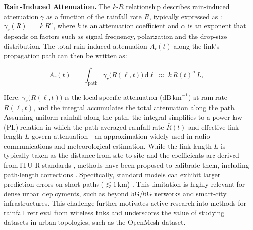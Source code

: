 \documentclass[manuscript]{copernicus}
\begin{document}
\textbf{Rain-Induced Attenuation.}
The \(k\text{-}R\) relationship describes rain-induced attenuation \(\gamma\) 
as a function of the rainfall rate \(R\), typically expressed as \citep{ITU,Olsen}:
\( \gamma_{r}(R) \;=\; k\,R^{\alpha}\), where \(k\) is an attenuation coefficient and \(\alpha\) is an exponent that depends on factors 
such as signal frequency, polarization and the drop-size distribution. 
The total rain-induced attenuation \(A_r(t)\) along the link’s propagation path can then be written as:

\begin{equation} \label{eq.PL}
    A_{r}(t) 
    \;=\; \int_{\text{path}} \gamma_{r}\bigl(R(\ell,t)\bigr)\,\mathrm{d}\ell  
    \; \approx \; k\,\overline{R}(t)^{\alpha}\, L,
\end{equation}

Here, \(\gamma_{r}\bigl(R(\ell,t)\bigr)\) is the local specific attenuation ($\mathrm{dB}\,\mathrm{km}^{-1}$) at rain rate \(R(\ell,t)\), and the integral accumulates the total attenuation along the path. 
Assuming uniform rainfall along the path, the integral simplifies to a power‑law (PL) relation in which the path‑averaged rainfall rate \(\overline{R}(t)\) and effective link length \(L\) govern attenuation—an approximation widely used in radio communications and meteorological estimation.
While the link length $L$ is typically taken as the distance from site to site and the coefficients are derived from ITU-R standards \citep{ITU837}, methods have been proposed to calibrate them, including path-length corrections \citep{ostrometzky2016calibration,da2007prediction,janco2022rain}. Specifically, standard models can exhibit larger prediction errors on short paths ($\lesssim 1\ \mathrm{km}$) \citep{habi2020uncertainties,janco2023city}. This limitation is highly relevant for dense urban deployments, such as beyond 5G/6G networks and smart-city infrastructures. This challenge further motivates active research into methods for rainfall retrieval from wireless links and underscores the value of studying datasets in urban topologies, such as the OpenMesh dataset.



\end{document}
